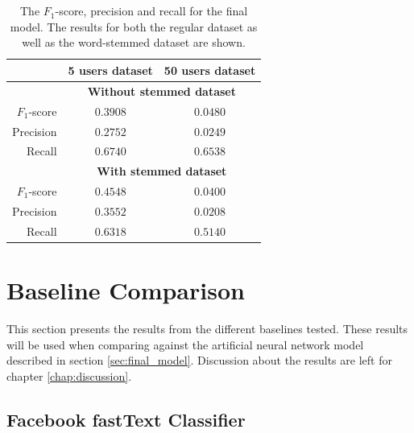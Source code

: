 \\\\
\begin{table}[h!]
    \centering
    \begin{tabular}{ r | c | c }
    & \textbf{5 users dataset} & \textbf{50 users dataset} \\ \hline    \hline
    & \multicolumn{2}{c}{\textbf{Without stemmed dataset}} \\ \hline \hline
    $F_1$-score & $0.3908$ & $0.0480$ \\ \hline
    Precision & $0.2752$ & $0.0249$ \\ \hline
    Recall & $0.6740$ & $0.6538$ \\ \hline \hline
    & \multicolumn{2}{c}{\textbf{With stemmed dataset}} \\ \hline \hline
    $F_1$-score & $0.4548$ & $0.0400$ \\ \hline
    Precision & $0.3552$ & $0.0208$ \\ \hline
    Recall & $0.6318$ & $0.5140$ \\ \hline
    \end{tabular}
    \caption{The $F_1$-score, precision and recall for the final model. The results for both the regular dataset as well as the word-stemmed dataset are shown.}
    \label{table:final_all_results}
\end{table}

\section{Baseline Comparison} 
\label{sec:baseline_comp}
This section presents the results from the different baselines tested. These results will be used when comparing against the artificial neural network model described in section \ref{sec:final_model}. Discussion about the results are left for chapter \ref{chap:discussion}.

\subsection{Facebook fastText Classifier}

